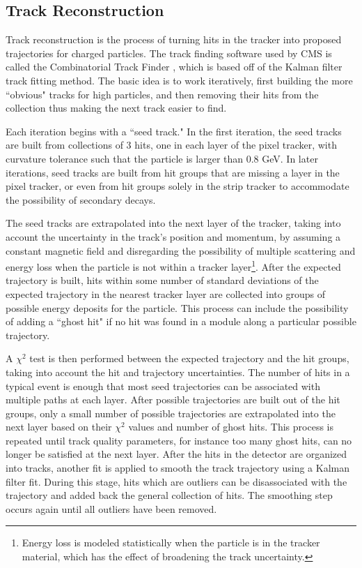   \subsection{Track Reconstruction} \label{sec:track_reconstruction}
    Track reconstruction is the process of turning hits in the tracker into proposed trajectories for charged particles. The track finding software used by CMS is called the Combinatorial Track Finder \cite[pg. 12]{cms_track_vertex}, which is based off of the Kalman filter \cite{kalman_filter} track fitting method. The basic idea is to work iteratively, first building the more ``obvious" tracks for high \pt particles, and then removing their hits from the collection thus making the next track easier to find.

    Each iteration begins with a ``seed track." In the first iteration, the seed tracks are built from collections of 3 hits, one in each layer of the pixel tracker, with curvature tolerance such that the particle \pt is larger than 0.8 GeV. In later iterations, seed tracks are built from hit groups that are missing a layer in the pixel tracker, or even from hit groups solely in the strip tracker to accommodate the possibility of secondary decays.

    The seed tracks are extrapolated into the next layer of the tracker, taking into account the uncertainty in the track's position and momentum, by assuming a constant magnetic field and disregarding the possibility of multiple scattering and energy loss when the particle is not within a tracker layer\footnote{Energy loss is modeled statistically when the particle is in the tracker material, which has the effect of broadening the track uncertainty.}. After the expected trajectory is built, hits within some number of standard deviations of the expected trajectory in the nearest tracker layer are collected into groups of possible energy deposits for the particle\cite{track_uncertainty}. This process can include the possibility of adding a ``ghost hit" if no hit was found in a module along a particular possible trajectory. 

    A $\chi^2$ test is then performed between the expected trajectory and the hit groups, taking into account the hit and trajectory uncertainties. The number of hits in a typical event is enough that most seed trajectories can be associated with multiple paths at each layer. After possible trajectories are built out of the hit groups, only a small number of possible trajectories are extrapolated into the next layer based on their $\chi^2$ values and number of ghost hits. This process is repeated until track quality parameters, for instance too many ghost hits, can no longer be satisfied at the next layer. After the hits in the detector are organized into tracks, another fit is applied to smooth the track trajectory using a Kalman filter fit. During this stage, hits which are outliers can be disassociated with the trajectory and added back the general collection of hits. The smoothing step occurs again until all outliers have been removed\cite[sec 4.3]{cms_track_vertex}.

